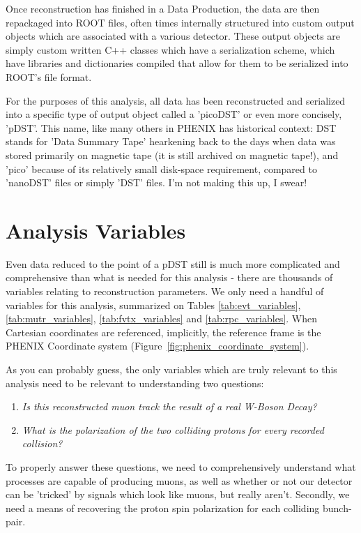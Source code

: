 Once reconstruction has finished in a Data Production, the data are then
repackaged into ROOT files, often times internally structured into custom output
objects which are associated with a various detector. These output objects are
simply custom written C++ classes which have a serialization scheme, which have
libraries and dictionaries compiled that allow for them to be serialized into
ROOT's file format.

For the purposes of this analysis, all data has been reconstructed and
serialized into a specific type of output object called a 'picoDST' or even more
concisely, 'pDST'. This name, like many others in PHENIX has historical context:
DST stands for 'Data Summary Tape' hearkening back to the days when data was
stored primarily on magnetic tape (it is still archived on magnetic tape!), and
'pico' because of its relatively small disk-space requirement, compared to
'nanoDST' files or simply 'DST' files. I'm not making this up, I swear!

\section{Analysis Variables}

Even data reduced to the point of a pDST still is much more complicated and
comprehensive than what is needed for this analysis - there are thousands of
variables relating to reconstruction parameters. We only need a handful of
variables for this analysis, summarized on Tables
\ref{tab:evt_variables},\ref{tab:mutr_variables}, \ref{tab:fvtx_variables} and
\ref{tab:rpc_variables}. When Cartesian coordinates are referenced, implicitly,
the reference frame is the PHENIX Coordinate system
(Figure~\ref{fig:phenix_coordinate_system}).

As you can probably guess, the only variables which are truly relevant to this
analysis need to be relevant to understanding two questions:

\begin{enumerate}
  \item \textit{Is this reconstructed muon track the result of a real W-Boson Decay?}
  \item \textit{What is the polarization of the two colliding protons for every recorded collision?}
\end{enumerate}

To properly answer these questions, we need to comprehensively understand what
processes are capable of producing muons, as well as whether or not our detector
can be 'tricked' by signals which look like muons, but really aren't. Secondly,
we need a means of recovering the proton spin polarization for each colliding
bunch-pair.

